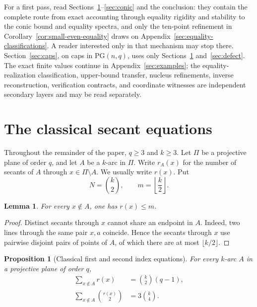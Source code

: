 \documentclass[11pt]{article}
\newtheorem{proposition}[theorem]{Proposition}
\newtheorem{lemma}[theorem]{Lemma}
\theoremstyle{definition}
\theoremstyle{remark}
\newcommand{\PG}{\mathrm{PG}}
\begin{document}
For a first pass, read Sections~\ref{sec:classical}--\ref{sec:conic} and the
conclusion: they contain the complete route from exact accounting through
equality rigidity and stability to the conic bound and equality spectra,
and only the ten-point refinement in
Corollary~\ref{cor:small-even-equality} draws on
Appendix~\ref{sec:equality-classifications}.  A reader interested only in
that mechanism may stop there.  Section~\ref{sec:caps}, on caps in
\(\PG(n,q)\), uses only Sections~\ref{sec:classical}
and~\ref{sec:defect}.  The exact finite
values continue in Appendix~\ref{sec:examples}; the equality-realization
classification, upper-bound transfer, nucleus refinements, inverse
reconstruction, verification contracts, and coordinate witnesses are
independent secondary layers and may be read separately.

\section{The classical secant equations}
\label{sec:classical}

Throughout the remainder of the paper, $q\ge3$ and $k\ge3$.  Let $\Pi$ be
a projective plane of order $q$, and let $A$ be a $k$-arc in $\Pi$.  Write
$r_A(x)$ for the number of secants of $A$ through
$x\in\Pi\setminus A$.  We usually write $r(x)$.  Put
\[
 N=\binom{k}{2},
 \qquad
 m=\left\lfloor\frac{k}{2}\right\rfloor.
\]

\begin{lemma}\label{lem:max-index}
For every $x\notin A$, one has $r(x)\le m$.
\end{lemma}

\begin{proof}
Distinct secants through $x$ cannot share an endpoint in $A$.  Indeed, two
lines through the same pair $x,a$ coincide.  Hence the secants through $x$
use pairwise disjoint pairs of points of $A$, of which there are at most
$\lfloor k/2\rfloor$.
\end{proof}

\begin{proposition}[Classical first and second index equations]
\label{prop:moments}
For every $k$-arc $A$ in a projective plane of order $q$,
\begin{align}
 \sum_{x\notin A}r(x)
   &=\binom{k}{2}(q-1), \label{eq:first-moment}\\
 \sum_{x\notin A}\binom{r(x)}2
   &=3\binom{k}{4}. \label{eq:second-moment}
\end{align}
\end{proposition}
\end{document}
